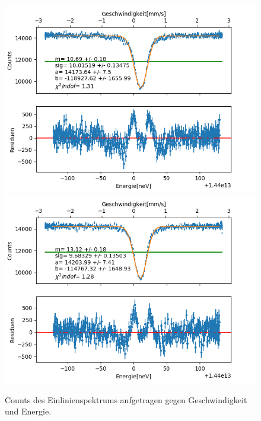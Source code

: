 \documentclass[12pt,a4paper]{article}
\begin{document}
\begin{figure}
\centering
\includegraphics[scale=0.8]{Bilder/Einlinien/Ein_gauss_vor.png}
\includegraphics[scale=0.8]{Bilder/Einlinien/Ein_gauss_nach.png}
\caption{Counts des Einlinienspektrums aufgetragen gegen Geschwindigkeit und Energie.}
\label{fig:Ein_gauss}
\end{figure}
\end{document}
